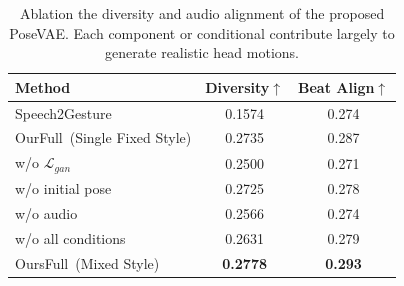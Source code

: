 \begin{table}[t]
\centering
\begin{tabular}{lcc}
\toprule
Method & Diversity$\uparrow$ & Beat Align$\uparrow$  \\ \hline
Speech2Gesture~\cite{speech2gesture}  & 0.1574 & 0.274  \\ \hline
OurFull~(Single Fixed Style) & 0.2735 & 0.287  \\
w/o  $\mathcal{L}_{gan}$  & 0.2500 & 0.271  \\
w/o  initial pose & 0.2725 & 0.278  \\
w/o  audio & 0.2566 &0.274  \\ 
w/o  all conditions & 0.2631 & 0.279  \\\hline
OursFull~(Mixed Style) & \textbf{0.2778} & \textbf{0.293} \\
\bottomrule
\end{tabular}
\vspace{-1em}
\caption{
Ablation the diversity and audio alignment of the proposed PoseVAE. Each component or conditional contribute largely to generate realistic head motions.
}
\vspace{-1em}
\label{tab:pose}
\end{table}
